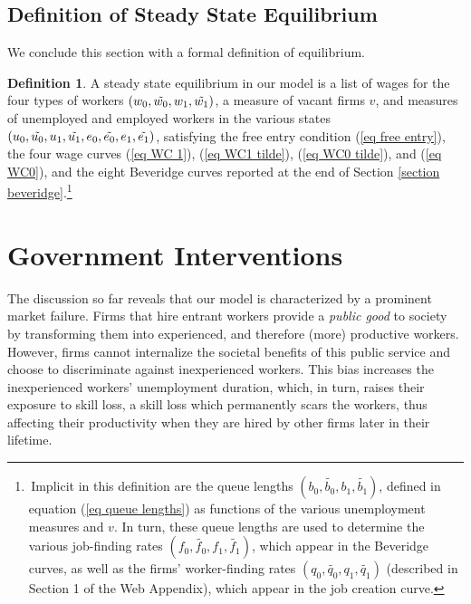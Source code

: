 \documentclass[12pt]{article} %
\theoremstyle{definition}
\newtheorem{definition}{Definition}%
\begin{document}
\subsection{Definition of Steady State Equilibrium}\label{section definition of equil} 

We conclude this section with a formal definition of equilibrium. 

\begin{definition}\label{definition equilibrium}
    A steady state equilibrium in our model is a list of wages for the four types of workers $(w_0, \Tilde{w_0}, w_1, \Tilde{w_1})$, a measure of vacant firms $v$, and measures of unemployed and employed workers in the various states $(u_0, \Tilde{u_0}, u_1, \Tilde{u_1}, e_0, \Tilde{e_0}, e_1, \Tilde{e_1})$, satisfying the free entry condition (\ref{eq free entry}), the four wage curves (\ref{eq WC 1}), (\ref{eq WC1 tilde}), (\ref{eq WC0 tilde}), and (\ref{eq WC0}), and the eight Beveridge curves reported at the end of Section \ref{section beveridge}.\footnote{\,Implicit in this definition are the queue lengths $(b_0,\tilde{b_0},b_1,\tilde{b_1})$, defined in equation (\ref{eq queue lengths}) as functions of the various unemployment measures and $v$. In turn, these queue lengths are used to determine the various job-finding rates $(f_0,\tilde{f_0},f_1,\tilde{f_1})$, which appear in the Beveridge curves, as well as the firms' worker-finding rates $(q_0,\tilde{q_0},q_1,\tilde{q_1})$ (described in Section 1 of the Web Appendix), which appear in the job creation curve.}   
\end{definition} 





\section{Government Interventions}\label{section policy interventions}

The discussion so far reveals that our model is characterized by a prominent market failure. Firms that hire entrant workers provide a \textit{public good} to society by transforming them into experienced, and therefore (more) productive workers. However, firms cannot internalize the societal benefits of this public service and choose to discriminate against inexperienced workers. This bias increases the inexperienced workers' unemployment duration, which, in turn, raises their exposure to skill loss, a skill loss which permanently scars the workers, thus affecting their productivity when they are hired by other firms later in their lifetime.
\end{document}
